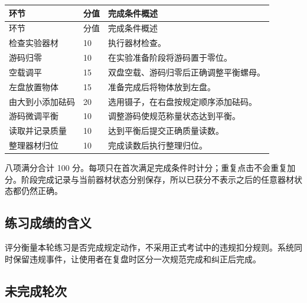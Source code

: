 \documentclass[UTF8,fontset=windows,zihao=-4]{ctexart}
\begin{document}
\begin{longtable}{@{}p{43mm}p{16mm}p{89mm}@{}}

\toprule

环节 & 分值 & 完成条件概述 \\

\midrule

\endfirsthead

\toprule

环节 & 分值 & 完成条件概述 \\

\midrule

\endhead

检查实验器材 & 10 & 执行器材检查。 \\

游码归零 & 10 & 在实验准备阶段将游码置于零位。 \\

空载调平 & 15 & 双盘空载、游码归零后正确调整平衡螺母。 \\

左盘放置物体 & 15 & 准备完成后将物体放到左盘。 \\

由大到小添加砝码 & 20 & 选用镊子，在右盘按规定顺序添加砝码。 \\

游码微调平衡 & 10 & 调整游码使规范称量状态达到平衡。 \\

读取并记录质量 & 10 & 达到平衡后提交正确质量读数。 \\

整理器材归位 & 10 & 完成读数后执行整理归位。 \\

\bottomrule

\end{longtable}

八项满分合计 100 分。每项只在首次满足完成条件时计分；重复点击不会重复加分。阶段完成记录与当前器材状态分别保存，所以已获分不表示之后的任意器材状态都仍然正确。

\subsection{练习成绩的含义}

评分衡量本轮练习是否完成规定动作，不采用正式考试中的违规扣分规则。系统同时保留违规事件，让使用者在复盘时区分一次规范完成和纠正后完成。

\subsection{未完成轮次}
\end{document}
